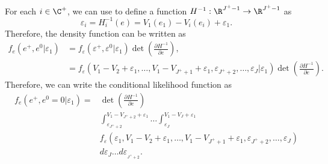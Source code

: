 \documentclass[12pt,a4paper]{article}
\begin{document}
For each $i \in \C^+$, we can use 
to define a function  $H^{-1}:\R^{J^+-1}\to\R^{J^+-1}$  as
\begin{equation}
  \label{eq:change_variable}
\varepsilon_{i} = H_i^{-1}(e) = V_{1}(e_{1}) - V_{i}(e_{i}) + \varepsilon_{1}.
\end{equation}
Therefore, the density function can be written as
\begin{align*}
  f_e(e^+, e^0 | \varepsilon_1)  &= f_\varepsilon(\varepsilon^+ , \varepsilon^0| \varepsilon_1) \det \left( \frac{\partial H^{-1}}{\partial e}\right),\\
     &= f_\varepsilon(V_1-V_2+\varepsilon_1, \ldots, V_1-V_{{J^+}+1} + \varepsilon_1, \varepsilon_{J^+ +2}, \ldots, \varepsilon_J | \varepsilon_1) \det \left( \frac{\partial H^{-1}}{\partial e}\right).
\end{align*}
Therefore, we can write the conditional likelihood function as
\begin{align*}
    f_e(e^+, e^0=0 | \varepsilon_1) =&  \det \left( \frac{\partial H^{-1}}{\partial e}\right)\\
    &\int_{\varepsilon_{J^+ +2}}^{V_1-V_{J^+ +2}+ \varepsilon_1}\ldots  \int_{\varepsilon_{J}}^{V_1-V_{J}+ \varepsilon_1} \\
    &f_\varepsilon(\varepsilon_1, V_1-V_2+\varepsilon_1, \ldots, V_1-V_{{J^+}+1} + \varepsilon_1, \varepsilon_{J^+ +2}, \ldots, \varepsilon_J ) \\
    &d\varepsilon_J\ldots d\varepsilon_{_{J^+ +2}}.
\end{align*}
\end{document}
